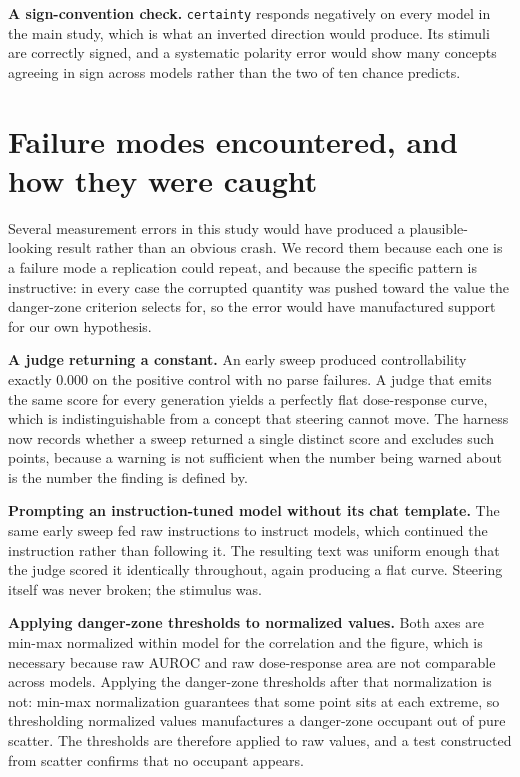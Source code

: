 \documentclass{article}
\begin{document}
\textbf{A sign-convention check.} \texttt{certainty} responds negatively on every
model in the main study, which is what an inverted direction would produce. Its
stimuli are correctly signed, and a systematic polarity error would show many
concepts agreeing in sign across models rather than the two of ten chance
predicts.

\section{Failure modes encountered, and how they were caught}
\label{app:failures}

Several measurement errors in this study would have produced a plausible-looking
result rather than an obvious crash. We record them because each one is a
failure mode a replication could repeat, and because the specific pattern is
instructive: in every case the corrupted quantity was pushed toward the value
the danger-zone criterion selects for, so the error would have manufactured
support for our own hypothesis.

\textbf{A judge returning a constant.} An early sweep produced controllability
exactly $0.000$ on the positive control with no parse failures. A judge that
emits the same score for every generation yields a perfectly flat dose-response
curve, which is indistinguishable from a concept that steering cannot move. The
harness now records whether a sweep returned a single distinct score and
excludes such points, because a warning is not sufficient when the number being
warned about is the number the finding is defined by.

\textbf{Prompting an instruction-tuned model without its chat template.} The
same early sweep fed raw instructions to instruct models, which continued the
instruction rather than following it. The resulting text was uniform enough
that the judge scored it identically throughout, again producing a flat curve.
Steering itself was never broken; the stimulus was.

\textbf{Applying danger-zone thresholds to normalized values.} Both axes are
min-max normalized within model for the correlation and the figure, which is
necessary because raw AUROC and raw dose-response area are not comparable across
models. Applying the danger-zone thresholds after that normalization is not:
min-max normalization guarantees that some point sits at each extreme, so
thresholding normalized values manufactures a danger-zone occupant out of pure
scatter. The thresholds are therefore applied to raw values, and a test
constructed from scatter confirms that no occupant appears.
\end{document}
